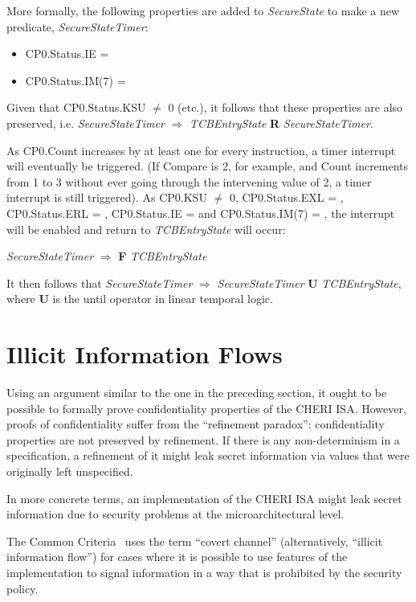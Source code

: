 More formally, the following properties are added to \emph{SecureState}
to make a new predicate, \emph{SecureStateTimer}:

\begin{itemize}
\item
CP0.Status.IE = \algorithmictrue{}
\item
CP0.Status.IM(7) = \algorithmictrue{}
\end{itemize}

Given that CP0.Status.KSU $\neq$ 0 (etc.),  it follows that these properties
are also preserved, i.e.
\emph{SecureStateTimer} $\Rightarrow$ \emph{TCBEntryState} \textbf{R}
\emph{SecureStateTimer}.

As CP0.Count increases by at least one for every instruction, a timer interrupt
will eventually be triggered. (If Compare is 2, for example, and Count
increments from 1 to 3 without ever going through the intervening value of 2,
a timer interrupt is still triggered). As CP0.KSU $\neq$ 0, CP0.Status.EXL
= \algorithmicfalse{}, CP0.Status.ERL = \algorithmicfalse{}, CP0.Status.IE =
\algorithmictrue{} and CP0.Status.IM(7) = \algorithmictrue{}, the interrupt
will be enabled and return to \emph{TCBEntryState} will occur:

\emph{SecureStateTimer} $\Rightarrow$ \textbf{F} \emph{TCBEntryState}

It then follows that \emph{SecureStateTimer} $\Rightarrow$ 
\emph{SecureStateTimer} \textbf{U} \emph{TCBEntryState}, where
\textbf{U} is the until operator in linear temporal logic.

\section*{Illicit Information Flows}

Using an argument similar to the one in the preceding section, it ought
to be possible to formally prove confidentiality properties of the CHERI ISA.
However, proofs of confidentiality suffer from the ``refinement paradox'':
confidentiality properties are not preserved by refinement. If there is
any non-determinism in a specification, a refinement of it might leak
secret information via values that were originally left unspecified.

In more concrete terms, an implementation of the CHERI ISA might leak secret
information due to security problems at the microarchitectural level.

The Common Criteria~\cite{CC2017-1} uses the term ``covert channel'' (alternatively,
``illicit information flow'') for cases where it is possible to use
features of the implementation to signal information in a way that is
prohibited by the security policy.

